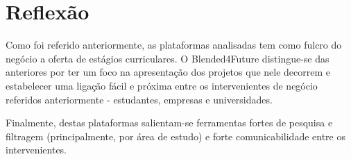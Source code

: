 \section{Reflexão}

Como foi referido anteriormente, as plataformas analisadas tem como fulcro do negócio a oferta de estágios curriculares. O Blended4Future distingue-se das anteriores por ter um foco na apresentação dos projetos que nele decorrem e estabelecer uma ligação fácil e próxima entre os intervenientes de negócio referidos anteriormente - estudantes, empresas e universidades.

Finalmente, destas plataformas salientam-se ferramentas fortes de pesquisa e filtragem (principalmente, por área de estudo) e forte comunicabilidade entre os intervenientes.
